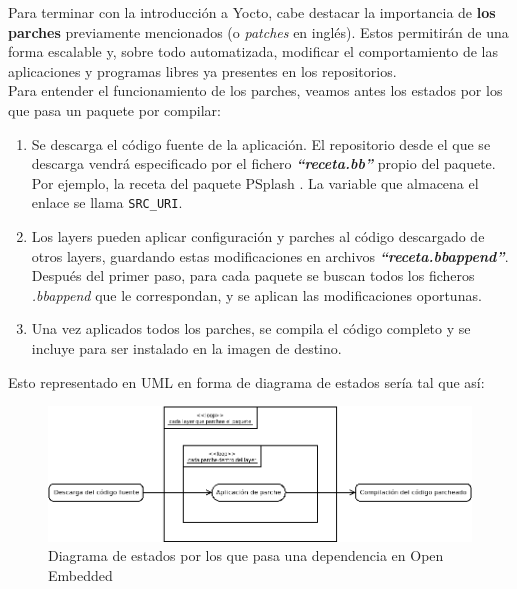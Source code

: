 Para terminar con la introducción a Yocto, cabe destacar la importancia de \textbf{los parches} previamente mencionados (o \textit{patches} en inglés). Estos permitirán de una forma escalable y, sobre todo automatizada, modificar el comportamiento de las aplicaciones y programas libres ya presentes en los repositorios.\\

Para entender el funcionamiento de los parches, veamos antes los estados por los que pasa un paquete por compilar:

\begin{enumerate}
	\item Se descarga el código fuente de la aplicación. El repositorio desde el que se descarga vendrá especificado por el fichero \textbf{\textit{``receta.bb''}} propio del paquete. Por ejemplo, la receta del paquete PSplash \cite{yocto-recipe-psplash}. La variable que almacena el enlace se llama \texttt{SRC\_URI}.
	\item Los layers pueden aplicar configuración y parches al código descargado de otros layers, guardando estas modificaciones en archivos \textbf{\textit{``receta.bbappend''}}. Después del primer paso, para cada paquete se buscan todos los ficheros \textit{.bbappend} que le correspondan, y se aplican las modificaciones oportunas.
	\item Una vez aplicados todos los parches, se compila el código completo y se incluye para ser instalado en la imagen de destino.
\end{enumerate}

Esto representado en UML en forma de diagrama de estados sería tal que así:

\begin{figure}[H]
	\centering
	\includegraphics[width=\linewidth]{imagenes/statechart-parche.png}
	\caption{Diagrama de estados por los que pasa una dependencia en Open Embedded}
	\label{statechart-parche}
\end{figure}

\noindent\makebox[\linewidth]{\rule{\textwidth}{0.4pt}}\\

